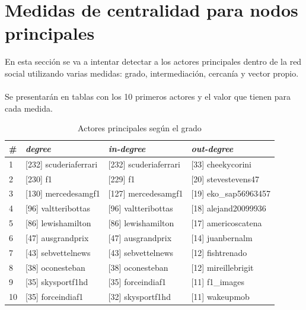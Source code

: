 \section{Medidas de centralidad para nodos principales}
\label{sec:hubs}

En esta sección se va a intentar detectar a los actores principales dentro de la red social utilizando varias medidas: grado, intermediación, cercanía y vector propio.
\\ \\
Se presentarán en tablas con los 10 primeros actores y el valor que tienen para cada medida.

\begin{table}[H]
	\centering
	\caption{Actores principales según el grado}
	\label{tab:actores-principales-grado}
	\begin{tabular}{| l | l l l |}
		\hline
		\# & \textit{degree}       & \textit{in-degree}     & \textit{out-degree}   \\
		\hline
		1  & [232] scuderiaferrari & [232] scuderiaferrari  & [33] cheekycorini     \\
		2  & [230] f1              & [229] f1               & [20] stevestevens47   \\
		3  & [130] mercedesamgf1   & [127] mercedesamgf1    & [19] eko\_sap56963457 \\
		4  & [96] valtteribottas   & [96] valtteribottas    & [18] alejand20099936  \\
		5  & [86] lewishamilton    & [86] lewishamilton     & [17] americoscatena   \\
		6  & [47] ausgrandprix     & [47] ausgrandprix      & [14] juanbernalm      \\
		7  & [43] sebvettelnews    & [43] sebvettelnews     & [12] fishtrenado      \\
		8  & [38] oconesteban      & [38] oconesteban       & [12] mireillebrigit   \\
		9  & [35] skysportf1hd     & [35] forceindiaf1      & [11] f1\_images       \\
		10 & [35] forceindiaf1     & [32] skysportf1hd      & [11] wakeupmob        \\
		\hline
	\end{tabular}
\end{table}

